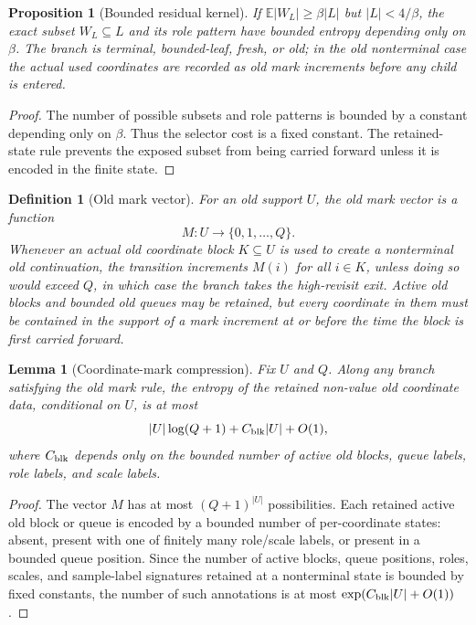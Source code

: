 \documentclass[11pt]{article}
\newtheorem{lemma}[theorem]{Lemma}
\newtheorem{proposition}[theorem]{Proposition}
\newtheorem{definition}[theorem]{Definition}
\theoremstyle{remark}
\newcommand{\E}{\mathbb E}
\begin{document}
\begin{proposition}[Bounded residual kernel]\label{prop:bounded-residual}
If $\E|W_L|\ge \beta |L|$ but $|L|<4/\beta$, the exact subset $W_L\subseteq L$ and its role pattern have bounded entropy depending only on $\beta$.  The branch is terminal, bounded-leaf, fresh, or old; in the old nonterminal case the actual used coordinates are recorded as old mark increments before any child is entered.
\end{proposition}

\begin{proof}
The number of possible subsets and role patterns is bounded by a constant depending only on $\beta$.  Thus the selector cost is a fixed constant.  The retained-state rule prevents the exposed subset from being carried forward unless it is encoded in the finite state.
\end{proof}

\begin{definition}[Old mark vector]
For an old support $U$, the old mark vector is a function
\[
        M:U\to\{0,1,\ldots,Q\}.
\]
Whenever an actual old coordinate block $K\subseteq U$ is used to create a nonterminal old continuation, the transition increments $M(i)$ for all $i\in K$, unless doing so would exceed $Q$, in which case the branch takes the high-revisit exit.  Active old blocks and bounded old queues may be retained, but every coordinate in them must be contained in the support of a mark increment at or before the time the block is first carried forward.
\end{definition}

\begin{lemma}[Coordinate-mark compression]\label{lem:mark-compression}
Fix $U$ and $Q$.  Along any branch satisfying the old mark rule, the entropy of the retained non-value old coordinate data, conditional on $U$, is at most
\[
        |U|\log(Q+1)+C_{\rm blk}|U|+O(1),
\]
where $C_{\rm blk}$ depends only on the bounded number of active old blocks, queue labels, role labels, and scale labels.
\end{lemma}

\begin{proof}
The vector $M$ has at most $(Q+1)^{|U|}$ possibilities.  Each retained active old block or queue is encoded by a bounded number of per-coordinate states: absent, present with one of finitely many role/scale labels, or present in a bounded queue position.  Since the number of active blocks, queue positions, roles, scales, and sample-label signatures retained at a nonterminal state is bounded by fixed constants, the number of such annotations is at most $\exp(C_{\rm blk}|U|+O(1))$.
\end{proof}
\end{document}
